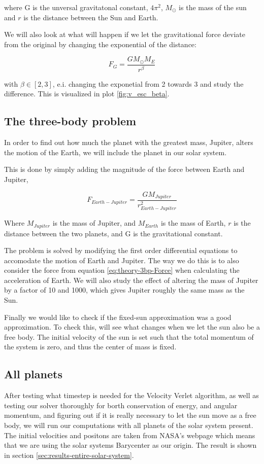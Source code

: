 \documentclass[../main.tex]{subfiles}
\begin{document}
where G is the unversal gravitatonal constant, $4 \pi^2$, $M_\odot$ is the mass of the sun and $r$ is the distance between the Sun and Earth.

We will also look at what will happen if we let the gravitational force deviate from the original by changing the exponential of the distance:

$$F_G = \frac{GM_\odot M_E}{r^{\beta}}$$

with $\beta \in [2,3]$, e.i. changing the exponetial from 2 towards 3 and study the difference. This is visualized in plot \ref{fig:v_esc_beta}.

\subsection{The three-body problem}
In order to find out how much the planet with the greatest mass, Jupiter, alters the motion of the Earth, we will include the planet in our solar system.

This is done by simply adding the magnitude of the force between Earth and Jupiter,

\begin{equation}
  F_{Earth-Jupiter} = \frac{GM_{Jupiter}}{r^2_{Earth-Jupiter}} \label{eq:theory-3bp-Force}
\end{equation}

Where $M_{Jupiter}$ is the mass of Jupiter, and $M_{Earth}$ is the mass of Earth, $r$ is the distance between the two planets, and G is the gravitational constant.

The problem is solved by modifying the first order differential equations to accomodate the motion of Earth and Jupiter. The way we do this is to also consider the force from equation \eqref{eq:theory-3bp-Force} when calculating the acceleration of Earth. We will also study the effect of altering the mass of Jupiter by a factor of 10 and 1000, which gives Jupiter roughly the same mass as the Sun.

Finally we would like to check if the fixed-sun approximation was a good approximation. To check this, will see what changes when we let the sun also be a free body. The initial velocity of the sun is set such that the total momentum of the system is zero, and thus the center of mass is fixed.

\subsection{All planets}
After testing what timestep is needed for the Velocity Verlet algorithm, as well as testing our solver thoroughly for borth conservation of energy, and angular momentum, and figuring out if it is really necessary to let the sun move as a free body, we will run our computations with all planets of the solar system present.
The initial velocities and positons are taken from NASA's webpage \cite{HorizonsNASA} which means that we are using the solar systems Barycenter as our origin. The result is shown in section \ref{sec:results-entire-solar-system}.
\end{document}
